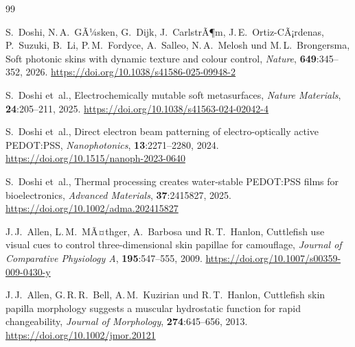 ﻿\documentclass[a4paper,12pt]{article}
\theoremstyle{definition}
\begin{document}
	\begin{thebibliography}{99}
		
		
		S.~Doshi, N.\,A.~GÃ¼sken, G.~Dijk, J.~CarlstrÃ¶m, J.\,E.~Ortiz-CÃ¡rdenas,
		P.~Suzuki, B.~Li, P.\,M.~Fordyce, A.~Salleo, N.\,A.~Melosh und
		M.\,L.~Brongersma,
		\newblock Soft photonic skins with dynamic texture and colour control,
		\newblock \emph{Nature}, \textbf{649}:345--352, 2026.
		\newblock \url{https://doi.org/10.1038/s41586-025-09948-2}
		
		
		S.~Doshi et~al.,
		\newblock Electrochemically mutable soft metasurfaces,
		\newblock \emph{Nature Materials}, \textbf{24}:205--211, 2025.
		\newblock \url{https://doi.org/10.1038/s41563-024-02042-4}
		
		S.~Doshi et~al.,
		\newblock Direct electron beam patterning of electro-optically active
		{PEDOT:PSS},
		\newblock \emph{Nanophotonics}, \textbf{13}:2271--2280, 2024.
		\newblock \url{https://doi.org/10.1515/nanoph-2023-0640}
		
		S.~Doshi et~al.,
		\newblock Thermal processing creates water-stable {PEDOT:PSS} films for
		bioelectronics,
		\newblock \emph{Advanced Materials}, \textbf{37}:2415827, 2025.
		\newblock \url{https://doi.org/10.1002/adma.202415827}
		
		
		J.\,J.~Allen, L.\,M.~MÃ¤thger, A.~Barbosa und R.\,T.~Hanlon,
		\newblock Cuttlefish use visual cues to control three-dimensional skin papillae
		for camouflage,
		\newblock \emph{Journal of Comparative Physiology A}, \textbf{195}:547--555,
		2009.
		\newblock \url{https://doi.org/10.1007/s00359-009-0430-y}
		
		J.\,J.~Allen, G.\,R.\,R.~Bell, A.\,M.~Kuzirian und R.\,T.~Hanlon,
		\newblock Cuttlefish skin papilla morphology suggests a muscular hydrostatic
		function for rapid changeability,
		\newblock \emph{Journal of Morphology}, \textbf{274}:645--656, 2013.
		\newblock \url{https://doi.org/10.1002/jmor.20121}
		

\end{thebibliography}
\end{document}
